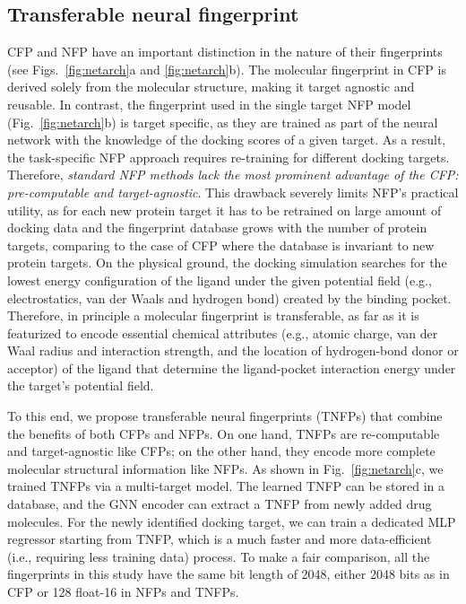 \documentclass[conference]{IEEEtran}
\begin{document}
\subsection{Transferable neural fingerprint}
CFP and NFP have an important distinction in the nature of their fingerprints (see Figs.~\ref{fig:netarch}a and \ref{fig:netarch}b). The molecular fingerprint in CFP is derived solely from the molecular structure, making it target agnostic and reusable. In contrast, the fingerprint used in the single target NFP model (Fig.~\ref{fig:netarch}b) is target specific, as they are trained as part of the neural network with the knowledge of the docking scores of a given target. As a result, the task-specific NFP approach requires re-training for different docking targets. Therefore, \textit{standard NFP methods lack the most prominent advantage of the CFP: pre-computable and target-agnostic}. This drawback severely limits NFP's practical  utility, as for each new protein target it has to be retrained on large amount of docking data and the fingerprint database grows with the number of protein targets, comparing to the case of CFP where the database is invariant to new protein targets. On the physical ground, the docking simulation searches for the lowest energy configuration of the ligand under the given potential field (e.g., electrostatics, van der Waals and hydrogen bond) created by the binding pocket. Therefore, in principle a molecular fingerprint is transferable, as far as it is featurized to encode essential chemical attributes (e.g., atomic charge, van der Waal radius and interaction strength, and the location of hydrogen-bond donor or acceptor) of the ligand that determine the ligand-pocket interaction energy under the target's potential field. 

To this end, we propose transferable neural fingerprints (TNFPs) that combine the benefits of both CFPs and NFPs. On one hand, TNFPs are re-computable and target-agnostic like CFPs; on the other hand, they encode more complete molecular structural information like NFPs. As shown in Fig.~\ref{fig:netarch}c, we trained TNFPs via a multi-target model. The learned TNFP can be stored in a database, and the GNN encoder can extract a TNFP from newly added drug molecules. For the newly identified docking target, we can train a dedicated MLP regressor  starting from TNFP, which is a much faster and more data-efficient (i.e., requiring less training data) process. To make a fair comparison, all the fingerprints in this study have the same bit length of 2048, either 2048 bits as in CFP or 128 float-16 in NFPs and TNFPs.
\end{document}
